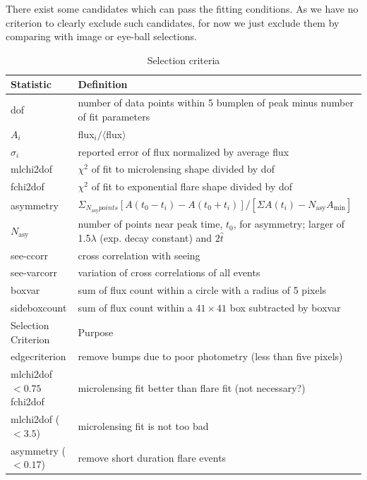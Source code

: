\documentclass[iop, apj]{emulateapj}
\newcommand{\?}{\stackrel{?}{=}}
\begin{document}

There exist some candidates which can pass the fitting conditions. 
As we have no criterion to clearly exclude such candidates, 
for now we just exclude them by comparing with image or eye-ball selections. 



\begin{table}[t]%
\label{tab:selecond}
    \caption{Selection criteria}
    \begin{center}
   \begin{tabular}{ll}
      \hline %
   \multicolumn{1}{l}{Statistic}&\multicolumn{1}{l}{Definition}\\
 \hline 
dof & number of data points within 5 bumplen of peak minus number of fit parameters\\
$A_i$ & flux$_i / \langle$flux$\rangle$\\
$\sigma_i$ & reported error of flux normalized by average flux\\
mlchi2dof & $\chi^2$ of fit to microlensing shape divided by dof \\
fchi2dof & $\chi^2$ of fit to exponential flare shape divided by dof \\ 
asymmetry & $\Sigma_{N_\mathrm{asy} points} [A(t_0-t_i)-A(t_0+t_i)]/[\Sigma A(t_i)-N_\mathrm{asy}A_\mathrm{min}]$\\
$N_\mathrm{asy}$ & number of points near peak time, $t_0$, for asymmetry; larger of 1.5$\lambda$ (exp. decay constant) and $2\hat t$\\
see-ccorr & cross correlation with seeing\\
see-varcorr & variation of cross correlations of all events\\
boxvar &  sum of flux count within a circle with a radius of 5 pixels \\
sideboxcount &  sum of flux count within a $41\times41$ box subtracted by boxvar\\
  \hline
  \hline
   \multicolumn{1}{l}{Selection Criterion}&\multicolumn{1}{l}{Purpose}\\
 \hline 
edgecriterion & remove bumps due to poor photometry (less than five pixels)\\
mlchi2dof$<0.75$ fchi2dof & microlensing fit better than flare fit (not necessary?)\\
mlchi2dof ($<3.5$) & microlensing fit is not too bad\\
asymmetry ($<0.17$) & remove short duration flare events\\

\end{tabular}
\end{center}
\end{table}
\end{document}
